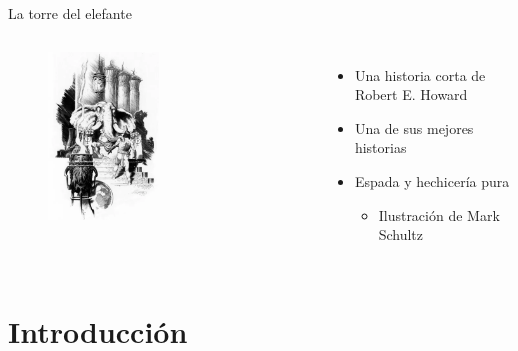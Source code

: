 
\begin{frame}{La torre del elefante}
\begin{columns}
 \begin{figure}[htb]
  \centering
  \includegraphics[width=0.5\textwidth]{img/Intro}
\end{figure}
     \begin{itemize}
         \item Una historia corta de Robert E. Howard
         \item Una de sus mejores historias
         \item Espada y hechicería pura
         \begin{itemize}
          \item Ilustración de Mark Schultz
         \end{itemize}
     \end{itemize}
\end{columns}
\end{frame}

\section{Introducción}
